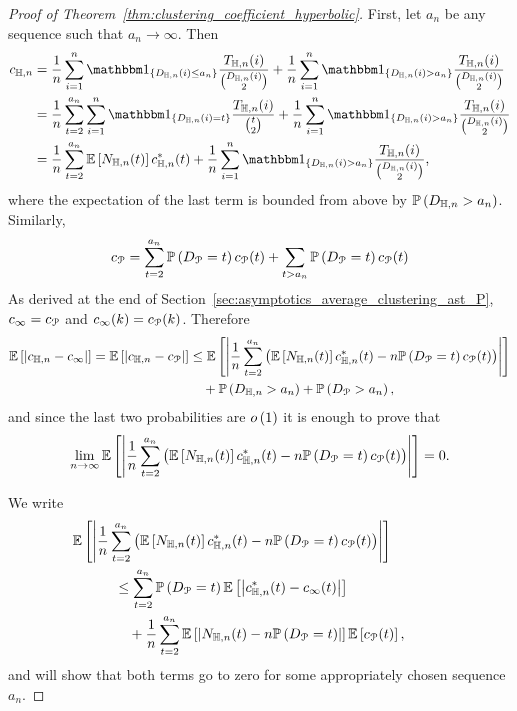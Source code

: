 \begin{proof}[Proof of Theorem~\ref{thm:clustering_coefficient_hyperbolic}]

First, let $a_n$ be any sequence such that $a_n \to \infty$. Then
\begin{align*}
	c_{\H,n} &= \frac{1}{n} \sum_{i = 1}^n \ind{D_{\H,n}(i) \le a_n} \frac{T_{\H,n}(i)}{\binom{D_{\H,n}(i)}{2}}
		+ \frac{1}{n} \sum_{i = 1}^n \ind{D_{\H,n}(i) > a_n} \frac{T_{\H,n}(i)}{\binom{D_{\H,n}(i)}{2}}\\
	&= \frac{1}{n} \sum_{t = 2}^{a_n} \sum_{i = 1}^n \ind{D_{\H,n}(i) = t} \frac{T_{\H,n}(i)}{\binom{t}{2}}
		+ \frac{1}{n} \sum_{i = 1}^n \ind{D_{\H,n}(i) > a_n} \frac{T_{\H,n}(i)}{\binom{D_{\H,n}(i)}{2}}\\
	&= \frac{1}{n} \sum_{t = 2}^{a_n} \Exp{N_{\H,n}(t)} c_{\H,n}^\ast(t)
		+ \frac{1}{n} \sum_{i = 1}^n \ind{D_{\H,n}(i) > a_n} \frac{T_{\H,n}(i)}{\binom{D_{\H,n}(i)}{2}},
\end{align*}
where the expectation of the last term is bounded from above by $\mathbb{P}\left(D_{\mathbb{H},n} > a_n\right)$. Similarly,
\[
	c_{{\mathcal P}} = \sum_{t = 2}^{a_n} \mathbb{P}\left(D_{{\mathcal P}} = t\right) c_{{\mathcal P}}(t) + \sum_{t > a_n} \mathbb{P}\left(D_{{\mathcal P}} = t\right) c_{{\mathcal P}}(t)
\]
As derived at the end of Section~\ref{sec:asymptotics_average_clustering_ast_P}, $c_\infty = c_{{\mathcal P}}$ and $c_\infty(k) = c_{{\mathcal P}}(k)$. Therefore
\begin{align*}
	\mathbb{E}\left[|c_{\mathbb{H},n}-c_\infty|\right]=\mathbb{E}\left[|c_{\mathbb{H},n} - c_{{\mathcal P}}|\right]
	&\le \mathbb{E}\left[\left|\frac{1}{n} \sum_{t = 2}^{a_n} \left(\mathbb{E}\left[N_{\mathbb{H},n}(t)\right] c_{\mathbb{H},n}^\ast(t) - 	
		n \mathbb{P}\left(D_{{\mathcal P}} = t\right)c_{{\mathcal P}}(t)\right)\right|\right]\\ 
	&\hspace{10pt}+ \mathbb{P}\left(D_{\mathbb{H},n} > a_n\right) + \mathbb{P}\left(D_{{\mathcal P}} > a_n\right),
\end{align*}
and since the last two probabilities are $o\left(1\right)$ it is enough to prove that
\[
	\lim_{n \to \infty} \mathbb{E}\left[\left|\frac{1}{n} \sum_{t = 2}^{a_n} \left(\mathbb{E}\left[N_{\mathbb{H},n}(t)\right] c_{\mathbb{H},n}^\ast(t) - 	
			n \mathbb{P}\left(D_{{\mathcal P}} = t\right)c_{{\mathcal P}}(t)\right)\right|\right] = 0.
\]

We write
\begin{align*}
	&\hspace{-30pt}\Exp{\left|\frac{1}{n} \sum_{t = 2}^{a_n} \left(\Exp{N_{\H,n}(t)} c_{\H,n}^\ast(t) - 	
		n \Prob{D_\Pcal = t}c_\Pcal(t)\right)\right|}\\
	&\le \sum_{t = 2}^{a_n} \Prob{D_\Pcal = t} \Exp{\left|c_{\H,n}^\ast(t) - c_{\infty}(t)\right|}\\
	&\hspace{10pt}+ \frac{1}{n} \sum_{t = 2}^{a_n} \Exp{\left|N_{\H,n}(t) - n \Prob{D_\Pcal = t}\right|}\Exp{c_\Pcal(t)},
\end{align*}
and will show that both terms go to zero for some appropriately chosen sequence $a_n$.


\end{proof}
